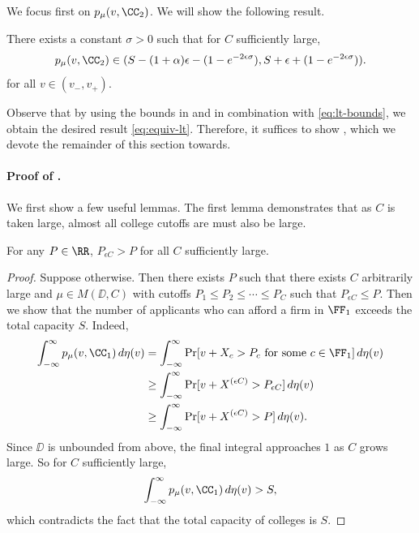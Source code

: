 \documentclass[10pt]{article}
\begin{document}
\begin{ReviewVerbatim}
\\
\\
We focus first on $p_\mu(v, \CC_2)$. We will show the following result.
\begin{proposition}\label{prop:lt-large-firms}
There exists a constant $\sigma > 0$ such that for $C$ sufficiently large,
    \begin{equation}\label{eq:lt-large-firms}
    p_\mu(v, \CC_2) \in (S - (1 + \alpha)\epsilon - (1 - e^{-2\epsilon\sigma}), S + \epsilon + (1 - e^{-2\epsilon\sigma})).
    \end{equation}
for all $v\in (v_-, v_+).$
\end{proposition}

Observe that by using the bounds in  and  in combination with \eqref{eq:lt-bounds}, we obtain the desired result \eqref{eq:equiv-lt}. Therefore, it suffices to show , which we devote the remainder of this section towards.

\paragraph{Proof of .}
We first show a few useful lemmas. The first lemma demonstrates that as $C$ is taken large, almost all college cutoffs are must also be large.

\begin{lemma}\label{lem:unbounded-cutoffs}
    For any $P\in \RR$, $P_{\epsilon C} > P$ for all $C$ sufficiently large.
\end{lemma}

\begin{proof}
    Suppose otherwise. Then there exists $P$ such that there exists $C$ arbitrarily large and $\mu \in M(\DD, C)$ with cutoffs $P_1\le P_2\le \cdots \le P_C$ such that $P_{\epsilon C} \le P$.
    Then we show that the number of applicants who can afford a firm in $\FF_1$ exceeds the total capacity $S$. Indeed,
    \begin{align}
        \int_{-\infty}^\infty p_\mu(v, \CC_1)\,d\eta(v)
        &= \int_{-\infty}^\infty \Pr[v + X_c > P_c\text{ for some $c\in \FF_1$}]\,d\eta(v)\\
        &\ge \int_{-\infty}^\infty \Pr[v + X^{(\epsilon C)} > P_{\epsilon C}]\,d\eta(v)\\
        &\ge \int_{-\infty}^\infty \Pr[v + X^{(\epsilon C)} > P]\,d\eta(v).
    \end{align}
    Since $\DD$ is unbounded from above, the final integral approaches $1$ as $C$ grows large. So for $C$ sufficiently large,
    \begin{equation}
        \int_{-\infty}^\infty p_\mu(v, \CC_1)\,d\eta(v) > S,
    \end{equation}
    which contradicts the fact that the total capacity of colleges is $S$.
\end{proof}


\end{ReviewVerbatim}
\end{document}
